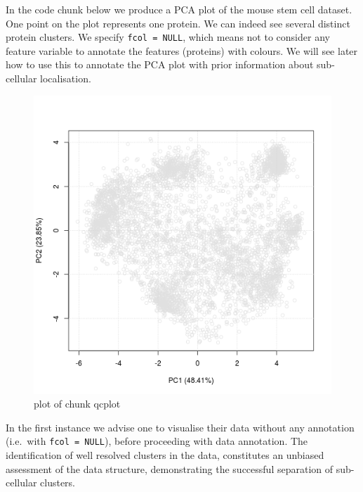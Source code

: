 In the code chunk below we produce a PCA plot of the mouse stem cell
dataset. One point on the plot represents one protein. We can indeed see
several distinct protein clusters. We specify \texttt{fcol = NULL},
which means not to consider any feature variable to annotate the
features (proteins) with colours. We will see later how to use this to
annotate the PCA plot with prior information about sub-cellular
localisation.

\begin{Shaded}
\begin{Highlighting}[]
\NormalTok{(}\NormalTok{)}
 \NormalTok{, } \NormalTok{)}
\end{Highlighting}
\end{Shaded}

\begin{figure}[htbp]
\centering
\includegraphics{figure/qcplot-1.png}
\caption{plot of chunk qcplot}
\end{figure}

In the first instance we advise one to visualise their data without any
annotation (i.e.~with \texttt{fcol = NULL}), before proceeding with data
annotation. The identification of well resolved clusters in the data,
constitutes an unbiased assessment of the data structure, demonstrating
the successful separation of sub-cellular clusters.


